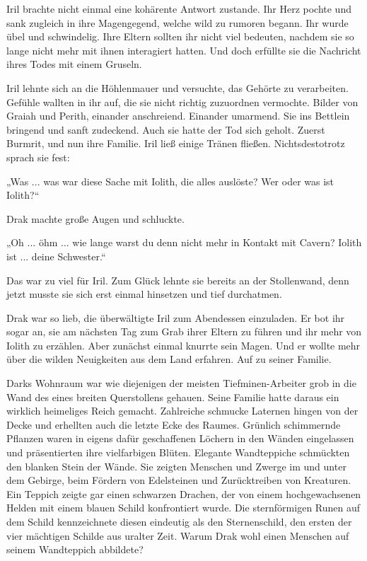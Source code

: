 Iril brachte nicht einmal eine kohärente Antwort zustande. Ihr Herz pochte und sank zugleich in ihre Magengegend, welche wild zu rumoren begann. Ihr wurde übel und schwindelig. Ihre Eltern sollten ihr nicht viel bedeuten, nachdem sie so lange nicht mehr mit ihnen interagiert hatten. Und doch erfüllte sie die Nachricht ihres Todes mit einem Gruseln.

Iril lehnte sich an die Höhlenmauer und versuchte, das Gehörte zu verarbeiten. Gefühle wallten in ihr auf, die sie nicht richtig zuzuordnen vermochte. Bilder von Graiah und Perith, einander anschreiend. Einander umarmend. Sie ins Bettlein bringend und sanft zudeckend. Auch sie hatte der Tod sich geholt. Zuerst Burmrit, und nun ihre Familie. Iril ließ einige Tränen fließen. Nichtsdestotrotz sprach sie fest:

„Was ... was war diese Sache mit Iolith, die alles auslöste? Wer oder was ist Iolith?“

Drak machte große Augen und schluckte.

„Oh ... öhm ... wie lange warst du denn nicht mehr in Kontakt mit Cavern? Iolith ist ... deine Schwester.“

Das war zu viel für Iril. Zum Glück lehnte sie bereits an der Stollenwand, denn jetzt musste sie sich erst einmal hinsetzen und tief durchatmen.



\trennzeichen



Drak war so lieb, die überwältigte Iril zum Abendessen einzuladen. Er bot ihr sogar an, sie am nächsten Tag zum Grab ihrer Eltern zu führen und ihr mehr von Iolith zu erzählen. Aber zunächst einmal knurrte sein Magen. Und er wollte mehr über die wilden Neuigkeiten aus dem Land erfahren. Auf zu seiner Familie.

Darks Wohnraum war wie diejenigen der meisten Tiefminen-Arbeiter grob in die Wand des eines breiten Querstollens gehauen. Seine Familie hatte daraus ein wirklich heimeliges Reich gemacht. Zahlreiche schmucke Laternen hingen von der Decke und erhellten auch die letzte Ecke des Raumes. Grünlich schimmernde Pflanzen waren in eigens dafür geschaffenen Löchern in den Wänden eingelassen und präsentierten ihre vielfarbigen Blüten. Elegante Wandteppiche schmückten den blanken Stein der Wände. Sie zeigten Menschen und Zwerge im und unter dem Gebirge, beim Fördern von Edelsteinen und Zurücktreiben von Kreaturen. Ein Teppich zeigte gar einen schwarzen Drachen, der von einem hochgewachsenen Helden mit einem blauen Schild konfrontiert wurde. Die sternförmigen Runen auf dem Schild kennzeichnete diesen eindeutig als den Sternenschild, den ersten der vier mächtigen Schilde aus uralter Zeit. Warum Drak wohl einen Menschen auf seinem Wandteppich abbildete?

